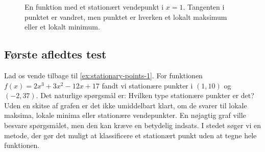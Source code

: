 \begin{figure}[htbp]
    \centering
    \caption{En funktion med et stationært vendepunkt i \(x=1\). Tangenten i punktet er vandret, men punktet er hverken et lokalt maksimum eller et lokalt minimum.}
    \label{fig:stationary-inflection}
\end{figure}

\subsection*{Første afledtes test}
Lad os vende tilbage til \autoref{ex:stationary-points-1}. For funktionen $f(x)=2 x^{3}+3 x^{2}-12 x+17$ fandt vi stationære punkter i $(1,10)$ og $(-2,37)$. Det naturlige spørgsmål er: Hvilken type stationære punkter er det? Uden en skitse af grafen er det ikke umiddelbart klart, om de svarer til lokale maksima, lokale minima eller stationære vendepunkter. En nøjagtig graf ville besvare spørgsmålet, men den kan kræve en betydelig indsats. I stedet søger vi en metode, der gør det muligt at klassificere et stationært punkt uden at tegne hele funktionen.

